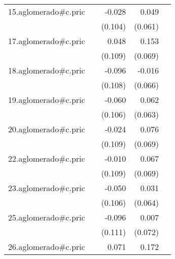 {\begin{longtable}{l*{4}{D{.}{.}{-1}}}
\addlinespace
15.aglomerado#c.pric&                     &      -0.028         &       0.049         &                     \\
            &                     &     (0.104)         &     (0.061)         &                     \\
\addlinespace
17.aglomerado#c.pric&                     &       0.048         &       0.153\sym{*}  &                     \\
            &                     &     (0.109)         &     (0.069)         &                     \\
\addlinespace
18.aglomerado#c.pric&                     &      -0.096         &      -0.016         &                     \\
            &                     &     (0.108)         &     (0.066)         &                     \\
\addlinespace
19.aglomerado#c.pric&                     &      -0.060         &       0.062         &                     \\
            &                     &     (0.106)         &     (0.063)         &                     \\
\addlinespace
20.aglomerado#c.pric&                     &      -0.024         &       0.076         &                     \\
            &                     &     (0.109)         &     (0.069)         &                     \\
\addlinespace
22.aglomerado#c.pric&                     &      -0.010         &       0.067         &                     \\
            &                     &     (0.109)         &     (0.069)         &                     \\
\addlinespace
23.aglomerado#c.pric&                     &      -0.050         &       0.031         &                     \\
            &                     &     (0.106)         &     (0.064)         &                     \\
\addlinespace
25.aglomerado#c.pric&                     &      -0.096         &       0.007         &                     \\
            &                     &     (0.111)         &     (0.072)         &                     \\
\addlinespace
26.aglomerado#c.pric&                     &       0.071         &       0.172\sym{*}  &                     \\

\end{longtable}}
